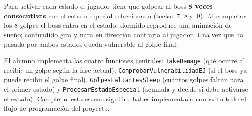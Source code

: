 \documentclass[a4paper,12pt]{article}
\begin{document}
Para activar cada estado el jugador tiene que golpear al boss \textbf{8 veces
consecutivas} con el estado especial seleccionado (teclas~7, 8 y~9). Al completar
los 8 golpes el boss entra en el estado: dormido reproduce una animación de sueño;
confundido gira y mira en dirección contraria al jugador. Una vez que ha pasado por
ambos estados queda vulnerable al golpe final.

El alumno implementa las cuatro funciones centrales: \texttt{TakeDamage} (qué ocurre
al recibir un golpe según la fase actual), \texttt{ComprobarVulnerabilidadEJ} (si
el boss ya puede recibir el golpe final), \texttt{GolpesFaltantesSleep} (cuántos
golpes faltan para el primer estado) y \texttt{ProcesarEstadoEspecial} (acumula y
decide si debe activarse el estado). Completar esta escena significa haber
implementado con éxito todo el flujo de programación del proyecto.
\end{document}
